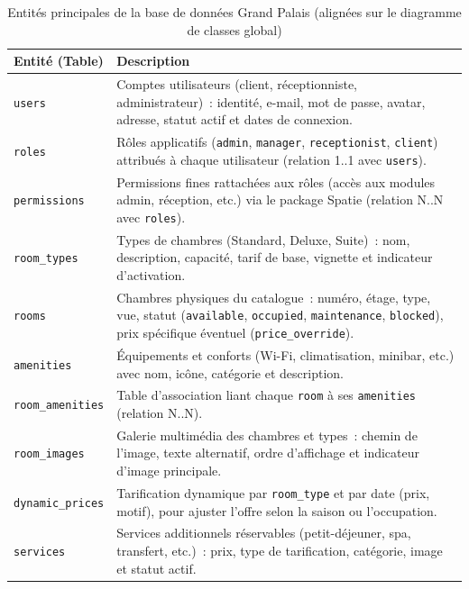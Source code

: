 \documentclass[12pt, a4paper]{report}
\begin{document}
\begin{table}[H]
  \centering
  \small
  \caption{Entités principales de la base de données Grand Palais (alignées sur le diagramme de classes global)}
  \label{tab:entites}
  \renewcommand{\arraystretch}{1.12}
  \begin{tabularx}{\textwidth}{lX}
    \toprule
    \textbf{Entité (Table)} & \textbf{Description} \\
    \midrule
    \texttt{users} &
      Comptes utilisateurs (client, réceptionniste, administrateur)~: identité, e-mail,
      mot de passe, avatar, adresse, statut actif et dates de connexion. \\
    \texttt{roles} &
      Rôles applicatifs (\texttt{admin}, \texttt{manager}, \texttt{receptionist}, \texttt{client})
      attribués à chaque utilisateur (relation 1..1 avec \texttt{users}). \\
    \texttt{permissions} &
      Permissions fines rattachées aux rôles (accès aux modules admin, réception, etc.)
      via le package Spatie (relation N..N avec \texttt{roles}). \\
    \texttt{room\_types} &
      Types de chambres (Standard, Deluxe, Suite)~: nom, description, capacité,
      tarif de base, vignette et indicateur d'activation. \\
    \texttt{rooms} &
      Chambres physiques du catalogue~: numéro, étage, type, vue, statut
      (\texttt{available}, \texttt{occupied}, \texttt{maintenance}, \texttt{blocked}),
      prix spécifique éventuel (\texttt{price\_override}). \\
    \texttt{amenities} &
      Équipements et conforts (Wi-Fi, climatisation, minibar, etc.) avec nom,
      icône, catégorie et description. \\
    \texttt{room\_amenities} &
      Table d'association liant chaque \texttt{room} à ses \texttt{amenities}
      (relation N..N). \\
    \texttt{room\_images} &
      Galerie multimédia des chambres et types~: chemin de l'image, texte alternatif,
      ordre d'affichage et indicateur d'image principale. \\
    \texttt{dynamic\_prices} &
      Tarification dynamique par \texttt{room\_type} et par date (prix, motif),
      pour ajuster l'offre selon la saison ou l'occupation. \\
    \texttt{services} &
      Services additionnels réservables (petit-déjeuner, spa, transfert, etc.)~:
      prix, type de tarification, catégorie, image et statut actif. \\

\end{tabularx}
\end{table}
\end{document}

